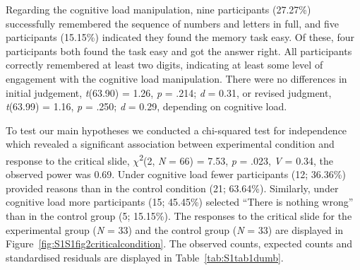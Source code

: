 \documentclass[
  american,
  man,floatsintext]{apa7}
\begin{document}
Regarding the cognitive load manipulation, nine participants (27.27\%) successfully remembered the sequence of numbers and letters in full, and five participants (15.15\%) indicated they found the memory task easy. Of these, four participants both found the task easy and got the answer right. All participants correctly remembered at least two digits, indicating at least some level of engagement with the cognitive load manipulation. There were no differences in initial judgement, \emph{t}(63.90) = 1.26, \emph{p} = .214; \emph{d} = 0.31, or revised judgment, \emph{t}(63.99) = 1.16, \emph{p} = .250; \emph{d} = 0.29, depending on cognitive load.

To test our main hypotheses we conducted a chi-squared test for independence which revealed a significant association between experimental condition and response to the critical slide, \(\chi\)\textsuperscript{2}(2, \emph{N} = 66) = 7.53, \emph{p} = .023, \emph{V} = 0.34, the observed power was 0.69. Under cognitive load fewer participants (12; 36.36\%) provided reasons than in the control condition (21; 63.64\%). Similarly, under cognitive load more participants (15; 45.45\%) selected ``There is nothing wrong'' than in the control group (5; 15.15\%). The responses to the critical slide for the experimental group (\emph{N} = 33) and the control group (\emph{N} = 33) are displayed in Figure~\ref{fig:S1S1fig2criticalcondition}. The observed counts, expected counts and standardised residuals are displayed in Table~\ref{tab:S1tab1dumb}.
\end{document}
